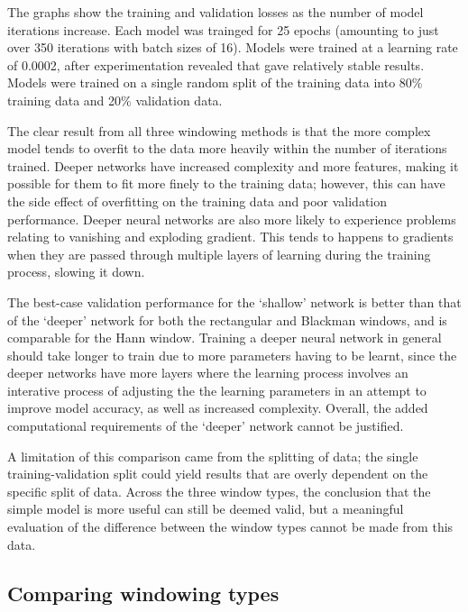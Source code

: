 \documentclass[class=report,11pt,crop=false]{standalone}
\begin{document}
The graphs show the training and validation losses as the number of model iterations increase. Each model was trainged for 25 epochs (amounting to just over 350 iterations with batch sizes of 16). Models were trained at a learning rate of 0.0002, after experimentation revealed that gave relatively stable results. Models were trained on a single random split of the training data into 80\% training data and 20\% validation data.

The clear result from all three windowing methods is that the more complex model tends to overfit to the data more heavily within the number of iterations trained. Deeper networks have increased complexity and more features, making it possible for them to fit more finely to the training data; however, this can have the side effect of overfitting on the training data and poor validation performance. Deeper neural networks are also more likely to experience problems relating to vanishing and exploding gradient. This tends to happens to gradients when they are passed through multiple layers of learning during the training process, slowing it down.

The best-case validation performance for the `shallow' network is better than that of the `deeper' network for both the rectangular and Blackman windows, and is comparable for the Hann window. Training a deeper neural network in general should take longer to train due to more parameters having to be learnt, since the deeper networks have more layers where the learning process involves an interative process of adjusting the the learning parameters in an attempt to improve model accuracy, as well as increased complexity. Overall, the added computational requirements of the `deeper' network cannot be justified.

A limitation of this comparison came from the splitting of data; the single training-validation split could yield results that are overly dependent on the specific split of data. Across the three window types, the conclusion that the simple model is more useful can still be deemed valid, but a meaningful evaluation of the difference between the window types cannot be made from this data.



\subsection{Comparing windowing types}
\end{document}
